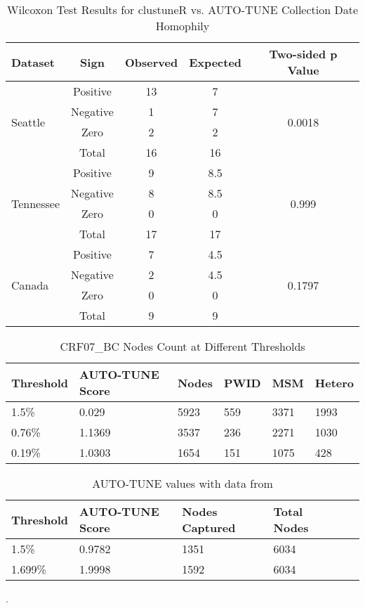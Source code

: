 \documentclass[utf8]{FrontiersinHarvard} %
\begin{document}
\begin{table}[h]
\centering
\caption{Wilcoxon Test Results for clustuneR vs. AUTO-TUNE Collection Date Homophily}
\label{table:wilcoxon-test}
\begin{tabular}{lcccc}
\hline
\textbf{Dataset} & \textbf{Sign} & \textbf{Observed} & \textbf{Expected} & \textbf{Two-sided p Value} \\
\hline
\multirow{4}{*}{Seattle} & Positive & 13 & 7 & \multirow{4}{*}{0.0018} \\
 & Negative & 1 & 7 &  \\
 & Zero & 2 & 2 & \\
 & Total & 16 & 16 & \\
\hline
\multirow{4}{*}{Tennessee} & Positive & 9 & 8.5 & \multirow{4}{*}{0.999} \\
 & Negative & 8 & 8.5 & \\
 & Zero & 0 & 0 & \\
 & Total & 17 & 17 & \\
\hline
\multirow{4}{*}{Canada} & Positive & 7 & 4.5 & \multirow{4}{*}{0.1797} \\
 & Negative & 2 & 4.5 & \\
 & Zero & 0 & 0 & \\
 & Total & 9 & 9 & \\
\hline
\end{tabular}
\end{table}


\begin{table}[h!]
	\centering
	\begin{tabularx}{\textwidth}{|X|X|X|X|X|X|}
		\hline
		Threshold & AUTO-TUNE Score & Nodes & PWID & MSM  & Hetero \\
		\hline
		1.5\%     & 0.029           & 5923  & 559  & 3371 & 1993   \\
		0.76\%    & 1.1369          & 3537  & 236  & 2271 & 1030   \\
		0.19\%    & 1.0303          & 1654  & 151  & 1075 & 428    \\
		\hline
	\end{tabularx}
	\caption{CRF07\_BC Nodes Count at Different Thresholds}
	\label{table:combined}
\end{table}



\begin{table}[h!]
	\centering
	\begin{tabularx}{\textwidth}{|X|X|X|X|X|X|}
		\hline
		Threshold & AUTO-TUNE Score & Nodes Captured & Total Nodes \\
		\hline
		1.5\%     & 0.9782          & 1351           & 6034        \\
		1.699\%   & 1.9998          & 1592           & 6034        \\
		\hline
	\end{tabularx}
	\caption{AUTO-TUNE values with data from \cite{rhee_national_2019}}.
	\label{table:rhee}
\end{table}
\end{document}
